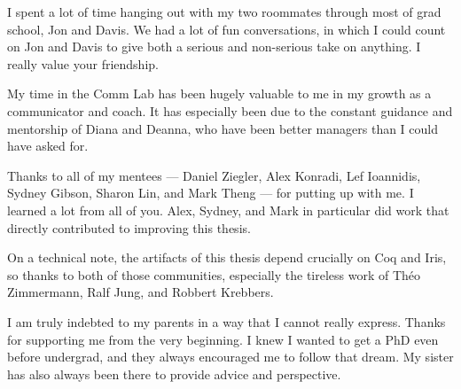 I spent a lot of time hanging out with my two roommates through most of grad
school, Jon and Davis. We had a lot of fun conversations, in which I could count
on Jon and Davis to give both a serious and non-serious take on anything. I
really value your friendship.

My time in the Comm Lab has been hugely valuable to me in my growth as a
communicator and coach. It has especially been due to the constant guidance and
mentorship of Diana and Deanna, who have been better managers than I could have
asked for.

Thanks to all of my mentees --- Daniel Ziegler, Alex Konradi, Lef Ioannidis,
Sydney Gibson, Sharon Lin, and Mark Theng --- for putting up with me. I learned
a lot from all of you. Alex, Sydney, and Mark in particular did work that
directly contributed to improving this thesis.

On a technical note, the artifacts of this thesis depend crucially on Coq and
Iris, so thanks to both of those communities, especially the tireless work of
Th\'eo Zimmermann, Ralf Jung, and Robbert Krebbers.

I am truly indebted to my parents in a way that I cannot really express. Thanks
for supporting me from the very beginning. I knew I wanted to get a PhD even
before undergrad, and they always encouraged me to follow that dream. My sister
has also always been there to provide advice and perspective.
